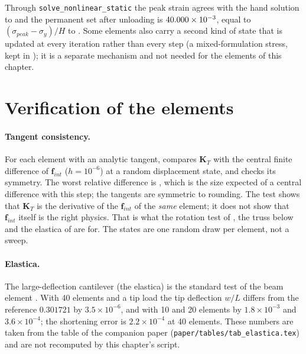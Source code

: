 Through \texttt{solve\_nonlinear\_static} the peak strain agrees with the hand solution to \cnlFesPeakErr and the permanent set after unloading is $40.000\times10^{-3}$, equal to $(\sigma_{peak}-\sigma_y)/H$ to \cnlFesSetErr. Some elements also carry a second kind of state that is updated at every iteration rather than every step (a mixed-formulation stress, kept in ); it is a separate mechanism and not needed for the elements of this chapter.

\section{Verification of the elements}\label{sec:nl-verif}

\paragraph{Tangent consistency.}
For each element with an analytic tangent,  compares $\bm K_T$ with the central finite difference of $\bm f_{int}$ ($h=10^{-6}$) at a random displacement state, and checks its symmetry. The worst relative difference is \cnlTangentWorst, which is the size expected of a central difference with this step; the tangents are symmetric to rounding. The test shows that $\bm K_T$ is the derivative of the $\bm f_{int}$ of the \emph{same} element; it does not show that $\bm f_{int}$ itself is the right physics. That is what the rotation test of , the truss below and the elastica of  are for. The states are one random draw per element, not a sweep.

\begin{table}[ht]
\centering\small

\caption{Analytic tangent against central finite differences of the internal force, one random displacement state per element.}\label{tab:nl-tangent}
\end{table}

\paragraph{Elastica.}\label{sec:nl-elastica}
The large-deflection cantilever (the elastica) is the standard test of the beam element . With 40 elements and a tip load the tip deflection $w/L$ differs from the reference $0.301721$ by $3.5\times10^{-6}$, and with 10 and 20 elements by $1.8\times10^{-3}$ and $3.6\times10^{-4}$; the shortening error is $2.2\times10^{-4}$ at 40 elements. These numbers are taken from the table of the companion paper (\texttt{paper/tables/tab\_elastica.tex}) and are not recomputed by this chapter's script.

